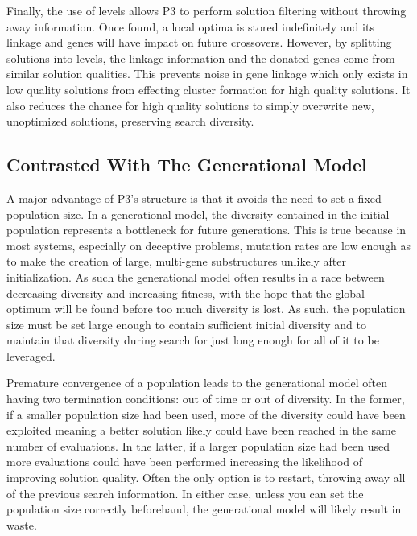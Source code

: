\documentclass{sig-alternate}
\begin{document}
Finally, the use of levels allows P3 to perform solution filtering without throwing
away information.  Once found, a local optima is stored indefinitely and its linkage
and genes will have impact on future crossovers.  However, by splitting solutions
into levels, the linkage information and the donated genes come from similar solution
qualities.  This prevents noise in gene linkage which only exists in low quality
solutions from effecting cluster formation for high quality solutions.  It also
reduces the chance for high quality solutions to simply overwrite new, unoptimized
solutions, preserving search diversity.

\begin{comment}
A major advantage to the design of P3 is that it makes very weak assumptions about
the search landscape.  In many evolutionary systems the crossover operator assumes
that genes linked in the search landscape are collocated in the genome.  This means
a problem changes difficulty depending on how the genome is set up, meaning the user
has to know information about gene linkage when applying the algorithm.  All of P3's
operations ignore gene ordering, removing that level of configuration from the user.
\end{comment}

\subsection{Contrasted With The Generational Model}
A major advantage of P3's structure is that it avoids the need to set a fixed
population size.  In a generational model, the diversity contained in the initial
population represents a bottleneck for future generations.  This is true
because in most systems, especially on deceptive problems, mutation rates are
low enough as to make the creation of large, multi-gene substructures unlikely
after initialization.  As such the generational model often results in a race between
decreasing diversity and increasing fitness, with the hope that the global optimum
will be found before too much diversity is lost.  As such, the population size
must be set large enough to contain sufficient initial diversity and
to maintain that diversity during search for just long enough for all of it to be
leveraged.

Premature convergence of a population leads to the generational model often having
two termination conditions: out of time or out of diversity.  In the former, if
a smaller population size had been used, more of the diversity could have been exploited
meaning a better solution likely could have been reached in the same number of evaluations.
In the latter, if a larger population size had been used more evaluations could have been
performed increasing the likelihood of improving solution quality.  Often the only option
is to restart, throwing away all of the previous search information.  In either case, unless
you can set the population size correctly beforehand, the generational model will likely
result in waste.
\end{document}
